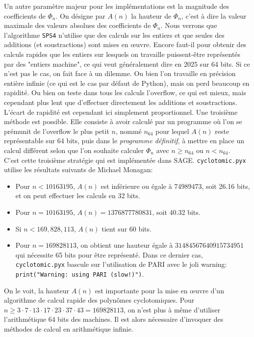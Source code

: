 \documentclass{article}
\newcounter{lemme}
\theoremstyle{break}                  %
\begin{document}
Un autre paramètre majeur pour les implémentations est la magnitude des coefficients de $\Phi_n$. On désigne par $A(n)$ la hauteur de $\Phi_n$, c'est à dire la valeur maximale des valeurs absolues des coefficients de $\Phi_n$. Nous verrons que l'algorithme \texttt{SPS4} n'utilise que des calculs sur les entiers et que seules des additions (et soustractions) sont mises en œuvre. Encore faut-il pour obtenir des calculs rapides que les entiers sur lesquels on travaille puissent-être représentés par des "entiers machine", ce qui veut généralement dire en 2025 sur 64 bits. Si ce n'est pas le cas, on fait face à un dilemme. Ou bien l'on travaille en précision entière infinie (ce qui est le cas par défaut de Python), mais on perd beaucoup en rapidité. Ou bien on teste dans tous les calculs l'overflow, ce qui est mieux, mais cependant plus lent que d'effectuer directement les additions et soustractions. L'écart de rapidité est cependant ici simplement proportionnel. Une troisième méthode est possible. Elle consiste à avoir calculé par un programme où l'on se prémunit de l'overflow le plus petit $n$, nommé $n_{64}$ pour lequel $A(n)$ reste représentable sur 64 bits, puis dans le \textit{programme définitif}, à mettre en place un calcul différent selon que l'on souhaite calculer $\Phi_n$ avec $n \ge n_{64}$ ou $n < n_{64}$.\\


C'est cette troisième stratégie qui est implémentée dans SAGE. \texttt{cyclotomic.pyx} utilise les résultats suivants de Michael Monagan:
\begin{itemize}
	\item Pour $n<10163195$, $A(n)$ est inférieure ou égale à 74989473, soit 26.16 bits, et on peut effectuer les calculs en 32 bits.
	\item Pour $n=10163195$, $A(n)=1376877780831$,  soit 40.32 bits.
	\item Si $n < 169,828,113$, $A(n)$ tient sur 60 bits.
	\item Pour $n = 169828113$, on obtient une hauteur égale à $31484567640915734951$ qui nécessite 65 bits pour être représenté. Dans ce dernier cas, \texttt{cyclotomic.pyx} bascule sur l'utilisation de PARI avec le joli warning: \texttt{print("Warning: using PARI (slow!)")}.\\
\end{itemize}

On le voit, la hauteur $A(n)$ est importante pour la mise en œuvre d'un algorithme de calcul rapide des polynômes cyclotomiques. Pour $n \ge 3 \cdot 7 \cdot 13 \cdot 17 \cdot 23 \cdot 37 \cdot 43 = 169828113$, on n'est plus à même d'utiliser l'arithmétique 64 bits des machines. Il est alors nécessaire d'invoquer des méthodes de calcul en arithmétique infinie.\\
\end{document}
